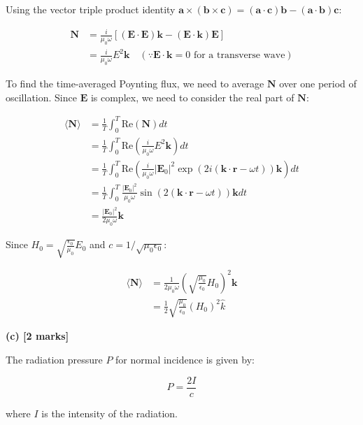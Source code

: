 \documentclass{article}
\begin{document}
Using the vector triple product identity $\mathbf{a} \times (\mathbf{b} \times \mathbf{c}) = (\mathbf{a} \cdot \mathbf{c})\mathbf{b} - (\mathbf{a} \cdot \mathbf{b})\mathbf{c}$:

\begin{align*}
\mathbf{N} &= \frac{i}{\mu_0 \omega} [(\mathbf{E} \cdot \mathbf{E})\mathbf{k} - (\mathbf{E} \cdot \mathbf{k})\mathbf{E}] \\
&= \frac{i}{\mu_0 \omega} E^2 \mathbf{k} \quad (\because \mathbf{E} \cdot \mathbf{k} = 0 \text{ for a transverse wave})
\end{align*}

To find the time-averaged Poynting flux, we need to average $\mathbf{N}$ over one period of oscillation. Since $\mathbf{E}$ is complex, we need to consider the real part of $\mathbf{N}$:

\begin{align*}
\langle \mathbf{N} \rangle &= \frac{1}{T} \int_0^T \text{Re}(\mathbf{N}) dt \\
&= \frac{1}{T} \int_0^T \text{Re} \left( \frac{i}{\mu_0 \omega} E^2 \mathbf{k} \right) dt \\
&= \frac{1}{T} \int_0^T \text{Re} \left( \frac{i}{\mu_0 \omega} |\mathbf{E}_0|^2 \exp(2i (\mathbf{k} \cdot \mathbf{r} - \omega t)) \mathbf{k} \right) dt \\
&= \frac{1}{T} \int_0^T \frac{|\mathbf{E}_0|^2}{\mu_0 \omega} \sin(2 (\mathbf{k} \cdot \mathbf{r} - \omega t)) \mathbf{k} dt \\
&= \frac{|\mathbf{E}_0|^2}{2 \mu_0 \omega} \mathbf{k} 
\end{align*}

Since $H_0 = \sqrt{\frac{\epsilon_0}{\mu_0}} E_0$ and $c = 1/\sqrt{\mu_0 \epsilon_0}$:

\begin{align*}
\langle \mathbf{N} \rangle &= \frac{1}{2 \mu_0 \omega} \left( \sqrt{\frac{\mu_0}{\epsilon_0}} H_0 \right)^2 \mathbf{k} \\
&= \frac{1}{2} \sqrt{\frac{\mu_0}{\epsilon_0}} (H_0)^2 \hat{k} 
\end{align*}

\textbf{(c) [2 marks]}

The radiation pressure $P$ for normal incidence is given by:

\begin{equation*}
P = \frac{2I}{c}
\end{equation*}

where $I$ is the intensity of the radiation.
\end{document}
